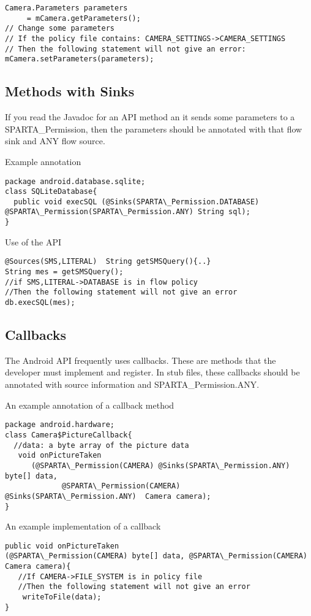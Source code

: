 \begin{Verbatim}
Camera.Parameters parameters
     = mCamera.getParameters();
// Change some parameters
// If the policy file contains: CAMERA_SETTINGS->CAMERA_SETTINGS
// Then the following statement will not give an error:
mCamera.setParameters(parameters);
\end{Verbatim}



\subsection{Methods with Sinks}
If you read the Javadoc for an API method an it sends some parameters to a SPARTA\_Permission, then the parameters
should be annotated with that flow sink and ANY flow source.  

Example annotation
\begin{Verbatim}
package android.database.sqlite;
class SQLiteDatabase{
  public void execSQL (@Sinks(SPARTA\_Permission.DATABASE) @SPARTA\_Permission(SPARTA\_Permission.ANY) String sql);
}
\end{Verbatim}
Use of the API
\begin{Verbatim}
@Sources(SMS,LITERAL)  String getSMSQuery(){..}
String mes = getSMSQuery();
//if SMS,LITERAL->DATABASE is in flow policy
//Then the following statement will not give an error
db.execSQL(mes);
\end{Verbatim}

\subsection{Callbacks}
The Android API frequently uses callbacks.  These are methods that the developer must 
implement and register.  In stub files, these callbacks should be annotated
with source information and SPARTA\_Permission.ANY.  

An example annotation of a callback method
\begin{Verbatim}
package android.hardware;
class Camera$PictureCallback{
  //data: a byte array of the picture data
   void onPictureTaken 
      (@SPARTA\_Permission(CAMERA) @Sinks(SPARTA\_Permission.ANY) byte[] data, 
             @SPARTA\_Permission(CAMERA) @Sinks(SPARTA\_Permission.ANY)  Camera camera);
}
\end{Verbatim}

An example implementation of a callback
\begin{Verbatim}
public void onPictureTaken
(@SPARTA\_Permission(CAMERA) byte[] data, @SPARTA\_Permission(CAMERA) Camera camera){
   //If CAMERA->FILE_SYSTEM is in policy file
   //Then the following statement will not give an error
    writeToFile(data);
}
\end{Verbatim}


